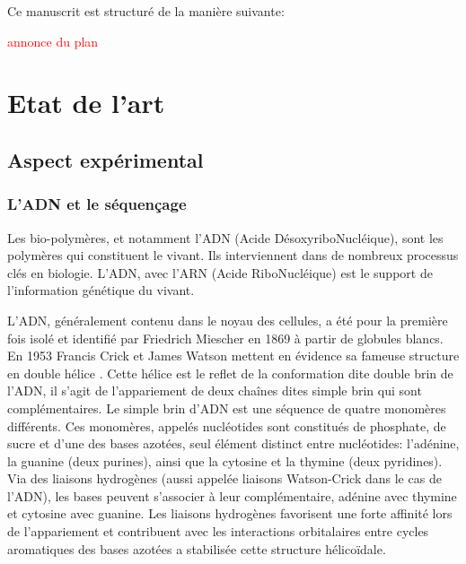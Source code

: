 \documentclass[a4paper,11pt]{article}
\begin{document}
Ce manuscrit est structuré de la manière suivante:


\textcolor{red}{annonce du plan}

\newpage

\tableofcontents



\newpage 

\section{Etat de l'art}

\subsection{Aspect expérimental}

\subsubsection{L'ADN et le séquençage}

Les bio-polymères, et notamment l'ADN (Acide DésoxyriboNucléique), sont les polymères qui constituent le vivant. Ils interviennent dans de nombreux processus clés en biologie.  L'ADN, avec l'ARN (Acide RiboNucléique) est le support de l'information génétique du vivant. 

L'ADN, généralement contenu dans le noyau des cellules, a été pour la première fois isolé et identifié par Friedrich Miescher en 1869 à partir de globules blancs. En 1953  Francis Crick et James Watson mettent en évidence sa fameuse structure en double hélice \cite{watsoncrick}. Cette hélice est le reflet de la conformation dite double brin de l'ADN, il s'agit de l'appariement de deux chaînes dites simple brin qui sont complémentaires. Le simple brin d'ADN est une séquence de quatre monomères différents. Ces monomères, appelés nucléotides sont constitués de phosphate, de sucre et d'une des bases azotées, seul élément distinct entre nucléotides: l'adénine, la guanine (deux purines), ainsi que la cytosine et la thymine (deux pyridines). Via des liaisons hydrogènes (aussi appelée liaisons Watson-Crick dans le cas de l'ADN), les bases peuvent s'associer à leur complémentaire, adénine avec thymine et cytosine avec guanine. Les liaisons hydrogènes favorisent une forte affinité lors de l'appariement et contribuent avec les interactions orbitalaires entre cycles aromatiques des bases azotées a stabilisée cette structure hélicoïdale.
\end{document}
